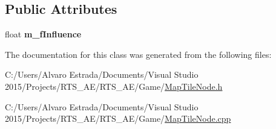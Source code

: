 \subsection*{Public Attributes}
\begin{DoxyCompactItemize}
\item 
float {\bfseries m\+\_\+f\+Influence}\hypertarget{classae_influence_tile_node_a0a4bbf4098305c2b632b3634e86ccc3a}{}\label{classae_influence_tile_node_a0a4bbf4098305c2b632b3634e86ccc3a}

\end{DoxyCompactItemize}


The documentation for this class was generated from the following files\+:\begin{DoxyCompactItemize}
\item 
C\+:/\+Users/\+Alvaro Estrada/\+Documents/\+Visual Studio 2015/\+Projects/\+R\+T\+S\+\_\+\+A\+E/\+R\+T\+S\+\_\+\+A\+E/\+Game/\hyperlink{_map_tile_node_8h}{Map\+Tile\+Node.\+h}\item 
C\+:/\+Users/\+Alvaro Estrada/\+Documents/\+Visual Studio 2015/\+Projects/\+R\+T\+S\+\_\+\+A\+E/\+R\+T\+S\+\_\+\+A\+E/\+Game/\hyperlink{_map_tile_node_8cpp}{Map\+Tile\+Node.\+cpp}\end{DoxyCompactItemize}
